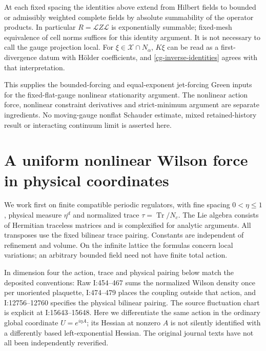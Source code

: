 \documentclass[11pt]{article}
\theoremstyle{remark}
\newcommand{\norm}[1]{\left\|#1\right\|}
\begin{document}
At each fixed spacing the identities above extend from Hilbert
fields to bounded or admissibly weighted complete fields by
absolute summability of the operator products. In particular
$R=\mathcal LZ\mathcal L$ is exponentially summable; fixed-mesh
equivalence of cell norms suffices for this identity argument.
It is not necessary to call the gauge projection local.
For $\xi\in\mathcal X\cap N_\alpha$, $K\xi$ can be read as
a first-divergence datum with H\"older coefficients, and
\eqref{cg-inverse-identities} agrees with that interpretation.

This supplies the bounded-forcing and equal-exponent jet-forcing
Green inputs for the fixed-flat-gauge nonlinear stationarity
argument. The nonlinear action force, nonlinear constraint
derivatives and strict-minimum argument are separate ingredients.
No moving-gauge nonflat Schauder estimate, mixed retained-history
result or interacting continuum limit is asserted here.


\section{A uniform nonlinear Wilson force in physical coordinates}
\label{wf-section}

We work first on finite compatible periodic regulators, with
fine spacing $0<\eta\le1$, physical measure $\eta^d$ and
normalized trace $\tau=\operatorname{Tr}/N_c$. The Lie algebra
consists of Hermitian traceless matrices and is complexified for
analytic arguments. All transposes use the fixed bilinear trace
pairing. Constants are independent of refinement and volume.
On the infinite lattice the formulas concern local variations;
an arbitrary bounded field need not have finite total action.

In dimension four the action, trace and physical pairing below
match the deposited conventions: Raw I:454--467 sums the
normalized Wilson density once per unoriented plaquette,
I:474--479 places the coupling outside that action, and
I:12756--12760 specifies the physical bilinear pairing.
The source fluctuation chart is explicit at I:15643--15648.
Here we differentiate the same action in the ordinary global
coordinate $U=e^{i\eta A}$; its Hessian at nonzero $A$ is not
silently identified with a differently based left-exponential
Hessian. The original journal texts have not all been
independently reverified.
\end{document}

